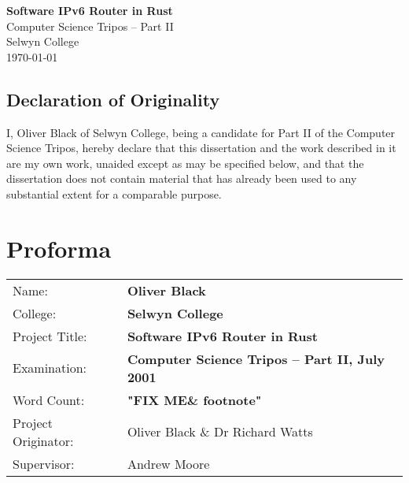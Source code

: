 \documentclass[12pt,a4paper,twoside,openright]{report}
\begin{document}





\pagestyle{empty}


\vspace*{60mm}
\begin{center}
\Huge
\textbf{Software IPv6 Router in Rust} \\[5mm]
Computer Science Tripos -- Part II \\[5mm]
Selwyn College \\[5mm]
\today  %
\end{center}

\newpage
\section*{Declaration of Originality}

I, Oliver Black of Selwyn College, being a candidate for Part II of 
the Computer Science Tripos, hereby declare
that this dissertation and the work described in it are my own work,
unaided except as may be specified below, and that the dissertation
does not contain material that has already been used to any substantial
extent for a comparable purpose.

\bigskip
{}

\medskip
{}


\pagestyle{plain}

\chapter*{Proforma}

{\large
\begin{tabular}{ll}
Name:               & \bf Oliver Black                      \\
College:            & \bf Selwyn College                     \\
Project Title:      & \bf Software IPv6 Router in Rust \\
Examination:        & \bf Computer Science Tripos -- Part II, July 2001  \\
Word Count:         & \bf "FIX ME\& footnote" \footnotemark[1]
                       \\
Project Originator: & Oliver Black \& Dr Richard Watts      \\
Supervisor:         & Andrew Moore                   \\ 
\end{tabular}
}
\end{document}
